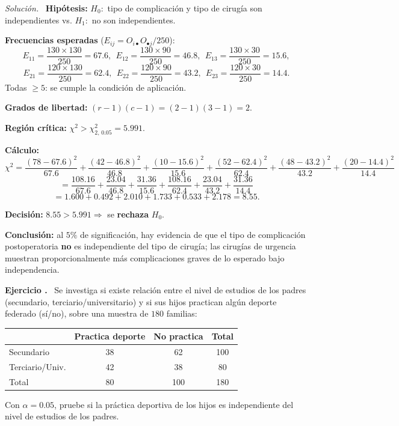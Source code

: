 \documentclass[11pt,a4paper]{article}
\newcounter{ejnum}
\newenvironment{ejercicio}{\refstepcounter{ejnum}\par\medskip\noindent\textbf{Ejercicio \theejnum.}~}{\par}
\newenvironment{solucion}{\par\noindent\textit{Solución.}~}{\par\vspace{1em}}
\begin{document}
\begin{solucion}
\textbf{Hipótesis:} $H_0:$ tipo de complicación y tipo de cirugía son independientes vs. $H_1:$ no son independientes.

\textbf{Frecuencias esperadas} ($E_{ij}=O_{i\bullet}O_{\bullet j}/250$):
\[
E_{11}=\frac{130\times130}{250}=67.6,\ \ E_{12}=\frac{130\times90}{250}=46.8,\ \ E_{13}=\frac{130\times30}{250}=15.6,
\]
\[
E_{21}=\frac{120\times130}{250}=62.4,\ \ E_{22}=\frac{120\times90}{250}=43.2,\ \ E_{23}=\frac{120\times30}{250}=14.4.
\]
Todas $\ge5$: se cumple la condición de aplicación.

\textbf{Grados de libertad:} $(r-1)(c-1)=(2-1)(3-1)=2$.

\textbf{Región crítica:} $\chi^2>\chi^2_{2,\,0.05}=5.991$.

\textbf{Cálculo:}
\[
\chi^2=\frac{(78-67.6)^2}{67.6}+\frac{(42-46.8)^2}{46.8}+\frac{(10-15.6)^2}{15.6}+\frac{(52-62.4)^2}{62.4}+\frac{(48-43.2)^2}{43.2}+\frac{(20-14.4)^2}{14.4}
\]
\[
=\frac{108.16}{67.6}+\frac{23.04}{46.8}+\frac{31.36}{15.6}+\frac{108.16}{62.4}+\frac{23.04}{43.2}+\frac{31.36}{14.4}
\]
\[
=1.600+0.492+2.010+1.733+0.533+2.178=8.55.
\]

\textbf{Decisión:} $8.55>5.991\Rightarrow$ se \textbf{rechaza} $H_0$.

\textbf{Conclusión:} al $5\%$ de significación, hay evidencia de que el tipo de complicación postoperatoria \textbf{no} es independiente del tipo de cirugía; las cirugías de urgencia muestran proporcionalmente más complicaciones graves de lo esperado bajo independencia.
\end{solucion}

\begin{ejercicio}
Se investiga si existe relación entre el nivel de estudios de los padres (secundario, terciario/universitario) y si sus hijos practican algún deporte federado (sí/no), sobre una muestra de $180$ familias:
\begin{center}
\begin{tabular}{@{}lcc|c@{}}
\toprule
 & Practica deporte & No practica & Total \\
\midrule
Secundario & 38 & 62 & 100 \\
Terciario/Univ. & 42 & 38 & 80 \\
\midrule
Total & 80 & 100 & 180 \\
\bottomrule
\end{tabular}
\end{center}
Con $\alpha=0.05$, pruebe si la práctica deportiva de los hijos es independiente del nivel de estudios de los padres.
\end{ejercicio}
\end{document}
